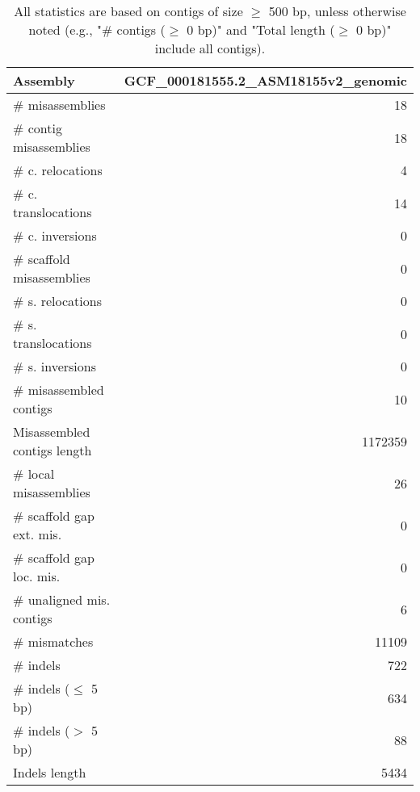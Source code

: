 \documentclass[12pt,a4paper]{article}
\begin{document}
\begin{table}[ht]
\begin{center}
\caption{All statistics are based on contigs of size $\geq$ 500 bp, unless otherwise noted (e.g., "\# contigs ($\geq$ 0 bp)" and "Total length ($\geq$ 0 bp)" include all contigs).}
\begin{tabular}{|l*{1}{|r}|}
\hline
Assembly & GCF\_000181555.2\_ASM18155v2\_genomic \\ \hline
\# misassemblies & 18 \\ \hline
\hspace{2mm}\# contig misassemblies & 18 \\ \hline
\hspace{5mm}\# c. relocations & 4 \\ \hline
\hspace{5mm}\# c. translocations & 14 \\ \hline
\hspace{5mm}\# c. inversions & 0 \\ \hline
\hspace{2mm}\# scaffold misassemblies & 0 \\ \hline
\hspace{5mm}\# s. relocations & 0 \\ \hline
\hspace{5mm}\# s. translocations & 0 \\ \hline
\hspace{5mm}\# s. inversions & 0 \\ \hline
\# misassembled contigs & 10 \\ \hline
Misassembled contigs length & 1172359 \\ \hline
\# local misassemblies & 26 \\ \hline
\# scaffold gap ext. mis. & 0 \\ \hline
\# scaffold gap loc. mis. & 0 \\ \hline
\# unaligned mis. contigs & 6 \\ \hline
\# mismatches & 11109 \\ \hline
\# indels & 722 \\ \hline
\hspace{5mm}\# indels ($\leq$ 5 bp) & 634 \\ \hline
\hspace{5mm}\# indels ($>$ 5 bp) & 88 \\ \hline
Indels length & 5434 \\ \hline
\end{tabular}
\end{center}
\end{table}
\end{document}
